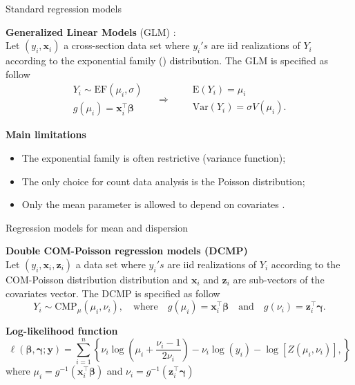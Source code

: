 \documentclass[11pt]{beamer}\usepackage[]{graphicx}\usepackage[]{color}
\begin{document}
\begin{frame}{Standard regression models}

\textbf{Generalized Linear Models} (GLM) \citep{Nelder1972}:\\[0.1cm]

Let $(y_i, \bm{x}_i)$ a cross-section data set where $y_i's$ are iid
realizations of $Y_i$ according to the exponential family ()
distribution. The GLM is specified as follow
$$
  \begin{gathered}
    Y_i \sim \text{EF}(\mu_i, \sigma)\\
    g(\mu_i) = \bm{x}_i^\top \bm{\beta}
  \end{gathered} \quad \Longrightarrow \quad
  \begin{aligned}
    &\text{E}(Y_i)=\mu_i\\
    &\text{Var}(Y_i)=\sigma V(\mu_i).
  \end{aligned}
$$
\vspace{0.3cm}

\textbf{Main limitations}
\begin{itemize}
    \item The exponential family is often restrictive (variance
      function);
    \item The only choice for count data analysis is the Poisson
      distribution;
    \item Only the mean parameter is allowed to depend on covariates
      \citep{Smyth1998}.
\end{itemize}
\end{frame}

\begin{frame}{Regression models for mean and dispersion}

\textbf{Double COM-Poisson regression models (DCMP)}\\[0.1cm]

Let $(y_i, \bm{x}_i, \bm{z}_i)$ a data set where $y_i's$ are iid
realizations of $Y_i$ according to the COM-Poisson distribution
distribution and $\bm{x}_i$ and $\bm{z}_i$ are sub-vectors of the
covariates vector. The DCMP is specified as follow
$$
  Y_i \sim \text{CMP}_\mu(\mu_i, \nu_i), \quad \text{where} \quad
  g(\mu_i) = \bm{x}_i^\top \bm{\beta} \quad \text{and} \quad
  g(\nu_i) = \bm{z}_i^\top \bm{\gamma}.
$$
\vspace{-0.1cm}

\textbf{Log-likelihood function}\\[-0.4cm]
$$
\ell(\bm{\beta}, \bm{\gamma} ; \bm{y}) = \sum_{i=1}^{n} \left \{
  \nu_i\log \left ( \mu_i + \frac{\nu_i-1}{2\nu_i}\right ) -
  \nu_i \log(y_i) - \log[Z(\mu_i, \nu_i)],
\right \}
$$
where $\mu_i = g^{-1}(\bm{x}_i^\top \bm{\beta})$ and
$\nu_i = g^{-1}(\bm{z}_i^\top \bm{\gamma})$
\end{frame}
\end{document}
